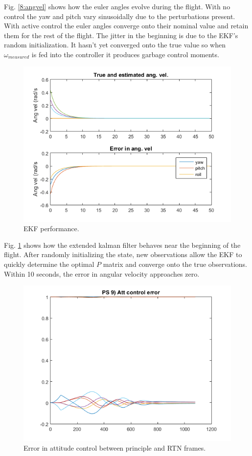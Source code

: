 \documentclass[12pt, letterpaper]{article}
\begin{document}
Fig. \ref{8:angvel} shows how the euler angles evolve during the flight. With no control the yaw and pitch vary sinusoidally due to the perturbations present. With active control the euler angles converge onto their nominal value and retain them for the rest of the flight. The jitter in the beginning is due to the EKF's random initialization. It hasn't yet converged onto the true value so when $\omega_{measured}$ is fed into the controller it produces garbage control moments.

\begin{figure}[H]
	\centering
	\includegraphics[scale=0.9]{ps8_02}
	\caption{EKF performance.}
	\label{8:ekf}
\end{figure}

Fig. \ref{8:ekf} shows how the extended kalman filter behaves near the beginning of the flight. After randomly initializing the state, new observations allow the EKF to quickly determine the optimal $P$ matrix and converge onto the true observations. Within 10 seconds, the error in angular velocity approaches zero.

\begin{figure}[H]
	\centering
	\includegraphics[scale=0.9]{ps8_03}
	\caption{Error in attitude control between principle and RTN frames.}
	\label{8:attError}
\end{figure}
\end{document}
